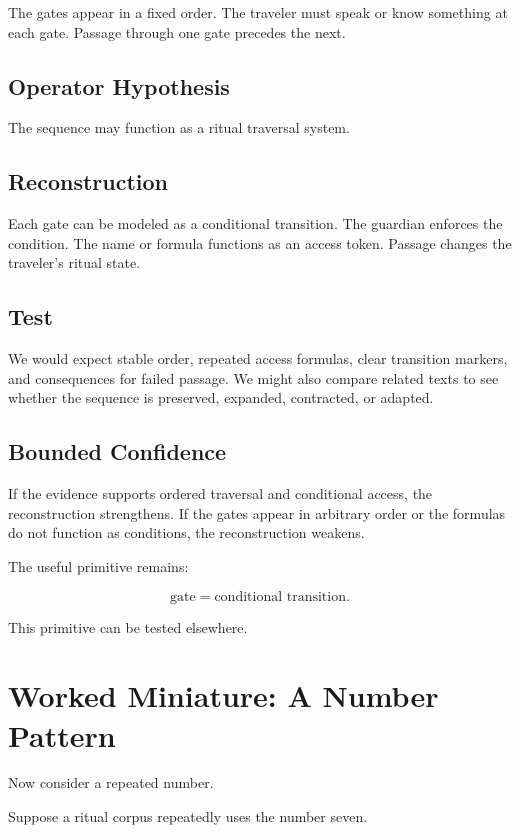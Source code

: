 \documentclass[11pt]{book}
\begin{document}
The gates appear in a fixed order. The traveler must speak or know something at each gate. Passage through one gate precedes the next.

\subsection{Operator Hypothesis}

The sequence may function as a ritual traversal system.

\subsection{Reconstruction}

Each gate can be modeled as a conditional transition. The guardian enforces the condition. The name or formula functions as an access token. Passage changes the traveler's ritual state.

\subsection{Test}

We would expect stable order, repeated access formulas, clear transition markers, and consequences for failed passage. We might also compare related texts to see whether the sequence is preserved, expanded, contracted, or adapted.

\subsection{Bounded Confidence}

If the evidence supports ordered traversal and conditional access, the reconstruction strengthens. If the gates appear in arbitrary order or the formulas do not function as conditions, the reconstruction weakens.

The useful primitive remains:

\[
\text{gate} = \text{conditional transition}.
\]

This primitive can be tested elsewhere.

\section{Worked Miniature: A Number Pattern}

Now consider a repeated number.

Suppose a ritual corpus repeatedly uses the number seven.
\end{document}

